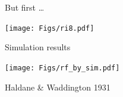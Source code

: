 \documentclass[12pt]{article}
\newcommand{\headsize}{\fontsize{35}{35} \selectfont}
\begin{document}
\vspace*{5mm}


\newpage


\headsize \color{myyellow}
\hfill \begin{minipage}{5.75in}
\centering
But first \dots
\end{minipage}

\vfill

\centerline{\texttt{[image: Figs/ri8.pdf]}}


\newpage

\headsize \color{myyellow}
\hfill \begin{minipage}{5.75in}
\centering
Simulation results
\end{minipage}

\vfill

\centerline{\texttt{[image: Figs/rf\_by\_sim.pdf]}}

\vspace{15mm}

\newpage

\headsize \color{myyellow}
\hfill 
\begin{minipage}{6.55in}
\centering
Haldane \& Waddington 1931
\end{minipage}

\vspace{15mm}
\end{document}
